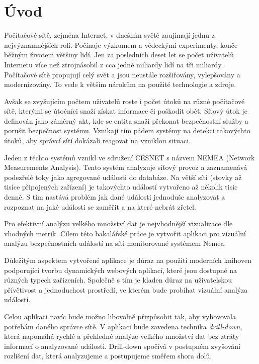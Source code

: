 
\newcommand\note[1]{{\Large \textcolor{red}{#1}}}

\chapter{Úvod}
Počítačové sítě, zejména Internet, v dnešním světě zaujímají jednu z nejvýznamnějších rolí. Počínaje výzkumem a vědeckými experimenty, konče běžným životem většiny lidí. Jen za posledních deset let se počet uživatelů Internetu více než ztrojnásobil z cca jedné miliardy lidí na tři miliardy. Počítačové sítě propujují celý svět a jsou neustále rozšiřovány, vylepšovány a modernizovány. To vede k větším nárokům na použité technologie a zdroje. 

Avšak se zvyšujícím počtem uživatelů roste i počet útoků na různé počítačové sítě, kterými se útočníci snaží získat informace či poškodit oběť. Síťový útok\cite{rfcAttack} je definován jako záměrný akt, kde se entita snaží překonat bezpečnostní služby a porušit bezpečnost systému. Vznikají tím pádem systémy na detekci takovýchto útoků, aby správcí sítí dokázali reagovat na vzniklou situaci.

Jeden z těchto systémů vznikl ve sdružení CESNET s názvem NEMEA (Network Measurements Analysis). Tento systém analyzuje síťový provoz a zaznamenává podezřelé toky jako agregované události do databáze. Na větší síti (stovky až tisíce připojených zařízení) je takovýchto událostí vytvořeno až několik tisíc denně. S tím nastává problém jak dané události jednoduše analyzovat a rozpoznat na jaké události se zaměřit a na které nebrát zřetel.

Pro efektivní analýzu velkého množství dat je nejvhodnější vizualizace dle vhodných metrik. Cílem této bakalářské práce je vytvořit aplikaci pro vizuální analýzu bezpečnostních událostí na síti monitorované systémem Nemea. 

Důležitým aspektem vytvořené aplikace je důraz na použití moderních knihoven podporující tvorbu dynamických webových aplikací, které jsou dostupné na různých typech zařízeních. Společně s tím je kladen důraz na uživatelskou přívětivost a jednoduchost prostředí, ve kterém bude probíhat vizuální analýza událostí.

Celou aplikaci navíc bude možno libovolně přizpůsobit tak, aby vyhovovala potřebám daného správce sítě. V aplikaci bude zavedena technika {\it drill-down}, která napomáhá rychlé a přehledné analýze velkého množství dat bez ztráty informací o analyzované události. Drill-down spočívá v postupném zvyšování rozlišení dat, která analyzujeme a postupujeme směřem shora dolů.

